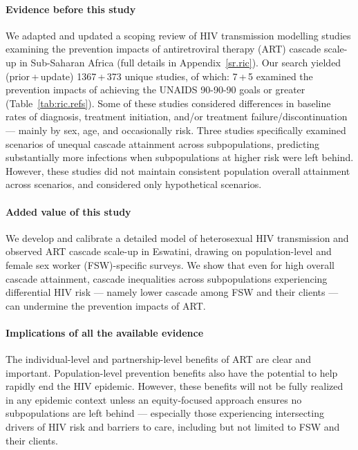 \newcommand{\pu}[2]{#1\,+\,#2}
\begin{ric}
  \paragraph{Evidence before this study}
  We adapted and updated a scoping review of HIV transmission modelling studies examining
  the prevention impacts of antiretroviral therapy (ART) cascade scale-up in Sub-Saharan Africa
  (full details in Appendix~\ref{sr.ric}).
  Our search yielded (\pu{prior}{update}) \pu{1367}{373} unique studies, of which:
  \pu{7}{5} examined the prevention impacts of achieving
  the UNAIDS 90-90-90 goals or greater (Table~\ref{tab:ric.refs}).
  Some of these studies considered differences in baseline rates of
  diagnosis, treatment initiation, and/or treatment failure/discontinuation
  --- mainly by sex, age, and occasionally risk.
  Three studies specifically examined scenarios of unequal cascade attainment across subpopulations,
  predicting substantially more infections when subpopulations at higher risk were left behind.
  However, these studies did not maintain consistent population overall attainment across scenarios,
  and considered only hypothetical scenarios.
  \paragraph{Added value of this study}
  We develop and calibrate a detailed model of heterosexual HIV transmission
  and observed ART cascade scale-up in Eswatini,
  drawing on population-level and female sex worker (FSW)-specific surveys.
  We show that even for high overall cascade attainment,
  cascade inequalities across subpopulations experiencing differential HIV risk
  --- namely lower cascade among FSW and their clients ---
  can undermine the prevention impacts of ART.
  \paragraph{Implications of all the available evidence}
  The individual-level and partnership-level benefits of ART are clear and important.
  Population-level prevention benefits also have the potential to help rapidly end the HIV epidemic.
  However, these benefits will not be fully realized in any epidemic context
  unless an equity-focused approach ensures no subpopulations are left behind ---
  especially those experiencing intersecting drivers of HIV risk and barriers to care,
  including but not limited to FSW and their clients.
\end{ric}
